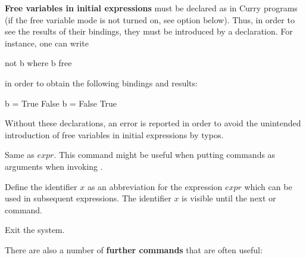 \begin{description}
\textbf{Free variables in initial expressions} must be declared as
in Curry programs
(if the free variable mode is not turned on,
see option  below).
Thus, in order to see the results of their bindings,
they must be introduced by a  declaration.
For instance, one can write
\begin{curry}
not b where b free
\end{curry}
in order to obtain the following bindings and results:
\begin{curry}
{b = True} False
{b = False} True
\end{curry}
Without these declarations, an error is reported in order to
avoid the unintended introduction of free variables in initial expressions
by typos.

\item[\fbox{:eval $expr$}]
Same as $expr$. This command might be useful when putting
commands as arguments when invoking .

\item[\fbox{:define $x$=$expr$}]
Define the identifier $x$ as an abbreviation for the expression $expr$
which can be used in subsequent expressions. The identifier $x$
is visible until the next  or  command.

\item[\fbox{\code{:quit}}] Exit the system.
\end{description}
%
\bigskip
%
There are also a number of {\bf further commands} that are often
useful:
%
